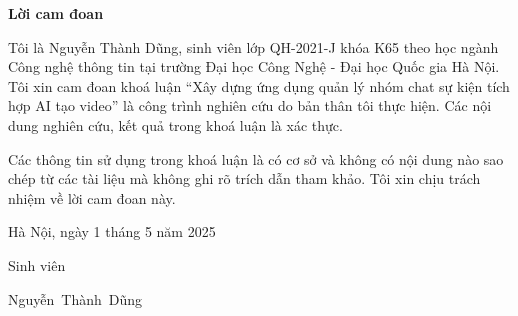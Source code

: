 \setcounter{page}{1}
\begin{center}
	\textbf{\large{Lời cam đoan}	}
\end{center}
Tôi là Nguyễn Thành Dũng, sinh viên lớp QH-2021-J khóa K65 theo học ngành Công nghệ thông tin tại trường Đại học Công Nghệ - Đại học Quốc gia Hà Nội. Tôi xin cam đoan khoá luận ``Xây dựng ứng dụng quản lý nhóm chat sự kiện tích hợp AI tạo video'' là công trình nghiên cứu do bản thân tôi thực hiện. Các nội dung nghiên cứu, kết quả trong khoá luận là xác thực.

Các thông tin sử dụng trong khoá luận là có cơ sở và không có nội dung nào sao chép từ các tài liệu mà không ghi rõ trích dẫn tham khảo. Tôi xin chịu trách nhiệm về lời cam đoan này.

\begin{flushright}
	Hà Nội, ngày 1 tháng 5 năm 2025
\end{flushright}

\begin{changemargin}{12cm}{2cm}
	Sinh viên
	\\[2cm]
\end{changemargin}

\begin{changemargin}{11cm}{2cm}
	\begin{center}
		Nguyễn~Thành~Dũng
	\end{center}
\end{changemargin}